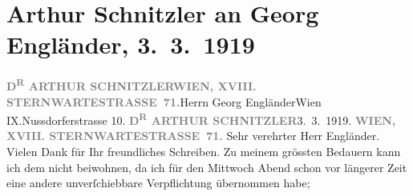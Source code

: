 

         
         \renewcommand{\erwaehntePersonen}{Personen: Peter Altenberg, Georg Engländer}
         \renewcommand{\erwaehnteOrte}{Orte: IX., Alsergrund, Konzerthaus, Nussdorfer Straße, Sternwartestraße, Wien}
         \renewcommand{\erwaehnteWerke}{}
               \section[Arthur Schnitzler an Georg Engländer, 3. 3. 1919]{ Arthur Schnitzler an Georg Engländer, 3. 3. 1919}\nopagebreak{}\rehead{ }\begin{ledgroupsized}[t]{13cm}\normalsize\beginnumbering \toendnotes[C]{\smallbreak\pagebreak[2]} 
\toendnotes[C]{\smallbreak}\pstart{}{\pb}\textcolor{gray}{\textbf{D\textsuperscript{R} ARTHUR SCHNITZLER}}\pend{}\pstart{}\textcolor{gray}{\textbf{WIEN, XVIII. STERNWARTESTRASSE 71.}}\pend{}{\bigskip}\pstart{}{\pb}Herrn Georg Engländer\pend{}\pstart{}Wien IX.\pend{}\pstart{}Nussdorferstrasse 10.\pend{}{\bigskip}\pstart
           \noindent{}{\pb}\textcolor{gray}{\textbf{D\textsuperscript{R} ARTHUR SCHNITZLER}}\hfill 3. 3. 1919.\pend
           \pstart
           \textcolor{gray}{\textbf{WIEN, XVIII. STERNWARTESTRASSE 71.}}\pend
           \pstart\center{}Sehr verehrter Herr Engländer.\pend\pstart
           Vielen Dank für Ihr freundliches Schreiben. Zu meinem grössten Bedauern kann ich dem
                  \label{K_L02322_1v}\label{K_L02322_1h} nicht beiwohnen, da ich für den Mittwoch{ }Abend schon vor längerer Zeit eine andere \introOben{}unverſchiebbare\introOben{} Verpflichtung übernommen habe\introOben{};\introOben{}

\end{ledgroupsized}
